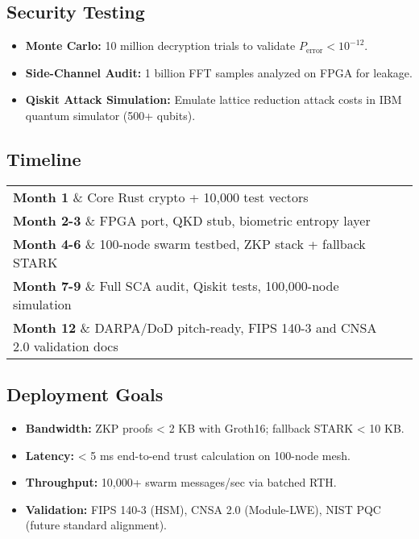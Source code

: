 \documentclass[12pt]{article}
\begin{document}
\subsection*{Security Testing}

\begin{itemize}
    \item \textbf{Monte Carlo:} 10 million decryption trials to validate 
    \( P_{\text{error}} < 10^{-12} \).
    \item \textbf{Side-Channel Audit:} 1 billion FFT samples analyzed on FPGA for leakage.
    \item \textbf{Qiskit Attack Simulation:} Emulate lattice reduction attack costs in IBM quantum simulator (500+ qubits).
\end{itemize}

\subsection*{Timeline}

\begin{tabular}{|l|l|}
\hline
\textbf{Month 1} \& Core Rust crypto + 10,000 test vectors \\
\textbf{Month 2-3} \& FPGA port, QKD stub, biometric entropy layer \\
\textbf{Month 4-6} \& 100-node swarm testbed, ZKP stack + fallback STARK \\
\textbf{Month 7-9} \& Full SCA audit, Qiskit tests, 100,000-node simulation \\
\textbf{Month 12} \& DARPA/DoD pitch-ready, FIPS 140-3 and CNSA 2.0 validation docs \\
\hline
\end{tabular}

\subsection*{Deployment Goals}

\begin{itemize}
    \item \textbf{Bandwidth:} ZKP proofs < 2 KB with Groth16; fallback STARK < 10 KB.
    \item \textbf{Latency:} < 5 ms end-to-end trust calculation on 100-node mesh.
    \item \textbf{Throughput:} 10,000+ swarm messages/sec via batched RTH.
    \item \textbf{Validation:} FIPS 140-3 (HSM), CNSA 2.0 (Module-LWE), NIST PQC (future standard alignment).
\end{itemize}
\end{document}
